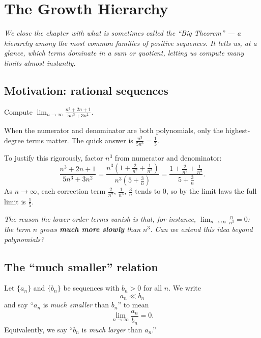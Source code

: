 \section{The Growth Hierarchy}
\label{sec:11.7}

\textit{We close the chapter with what is sometimes called the ``Big Theorem'' --- a hierarchy among the most common families of positive sequences.  It tells us, at a glance, which terms dominate in a sum or quotient, letting us compute many limits almost instantly.}

\subsection*{Motivation: rational sequences}

\begin{example}
\label{ex:11-5}
Compute $\displaystyle\lim_{n\to\infty}\frac{n^{3}+2n+1}{5n^{3}+3n^{2}}$.

When the numerator and denominator are both polynomials, only the highest-degree terms matter.  The quick answer is $\frac{n^{3}}{5n^{3}}=\frac{1}{5}$.

To justify this rigorously, factor $n^{3}$ from numerator and denominator:
\[
  \frac{n^{3}+2n+1}{5n^{3}+3n^{2}}
  =\frac{n^{3}\!\left(1+\frac{2}{n^{2}}+\frac{1}{n^{3}}\right)}
        {n^{3}\!\left(5+\frac{3}{n}\right)}
  =\frac{1+\frac{2}{n^{2}}+\frac{1}{n^{3}}}{5+\frac{3}{n}}.
\]
As $n\to\infty$, each correction term $\frac{2}{n^{2}}$, $\frac{1}{n^{3}}$, $\frac{3}{n}$ tends to $0$, so by the limit laws the full limit is $\frac{1}{5}$.
\end{example}

\textit{The reason the lower-order terms vanish is that, for instance, $\lim_{n\to\infty}\frac{n}{n^{3}}=0$: the term $n$ grows \textbf{much more slowly} than $n^{3}$.  Can we extend this idea beyond polynomials?}

\subsection*{The ``much smaller'' relation}

\begin{definition}
\label{def:11-7}
Let $\{a_{n}\}$ and $\{b_{n}\}$ be sequences with $b_{n}>0$ for all $n$.  We write
\[
  a_{n}\ll b_{n}
\]
and say ``$a_{n}$ is \emph{much smaller} than $b_{n}$'' to mean
\[
  \lim_{n\to\infty}\frac{a_{n}}{b_{n}}=0.
\]
Equivalently, we say ``$b_{n}$ is \emph{much larger} than $a_{n}$.''
\end{definition}

